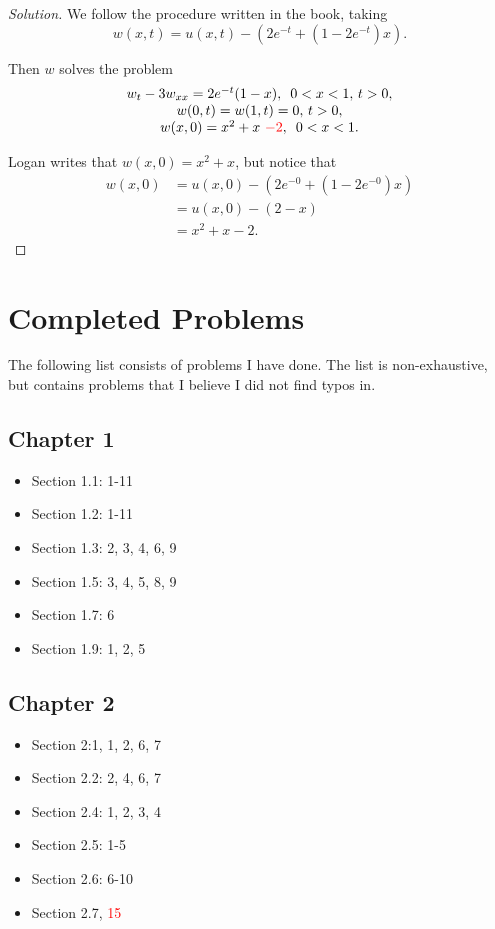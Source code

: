 \documentclass[11pt]{article}
\newenvironment{solution}
  {\renewcommand\qedsymbol{$\blacksquare$}\begin{proof}[Solution]}
  {\end{proof}}
\theoremstyle{definition}
\begin{document}
\begin{solution}
We follow the procedure written in the book, taking 
\[ w(x, t) = u(x, t) - \left(2e^{-t} + \left(1-2e^{-t}\right)x\right).\]

Then $w$ solves the problem
\[
\begin{array}{c}
w_{t} - 3w_{xx} = 2e^{-t}(1-x), \, \, \, 0 < x < 1, \, t > 0,\\
w(0, t) = w(1, t) = 0, \, t > 0,\\
w(x, 0) = x^2 + x \text{ } \textcolor{red}{- 2}, \,\,\, 0 < x < 1.
\end{array}
\]

Logan writes that $w(x, 0) = x^2 + x$, but notice that
\begin{align*}
  w(x, 0) &= u(x, 0) - \left(2e^{-0} + \left(1-2e^{-0}\right)x\right) \\
  &= u(x, 0) - (2 - x) \\
  &= x^2 + x - 2.
\end{align*}

\end{solution}
\appendix

\newpage

\section{Completed Problems}

The following list consists of problems I have done. The list is non-exhaustive, but contains problems that I believe I did not find typos in. 
\subsection{Chapter 1}
\begin{itemize}
  \item Section 1.1: 1-11
  \item Section 1.2: 1-11
  \item Section 1.3: 2, 3, 4, 6, 9
  \item Section 1.5: 3, 4, 5, 8, 9
  \item Section 1.7: 6
  \item Section 1.9: 1, 2, 5
\end{itemize}

\subsection{Chapter 2}
\begin{itemize}
  \item Section 2:1, 1, 2, 6, 7
  \item Section 2.2: 2, 4, 6, 7
  \item Section 2.4: 1, 2, 3, 4
  \item Section 2.5: 1-5
  \item Section 2.6: 6-10
  \item Section 2.7, \textcolor{red}{15}
\end{itemize}
\end{document}
